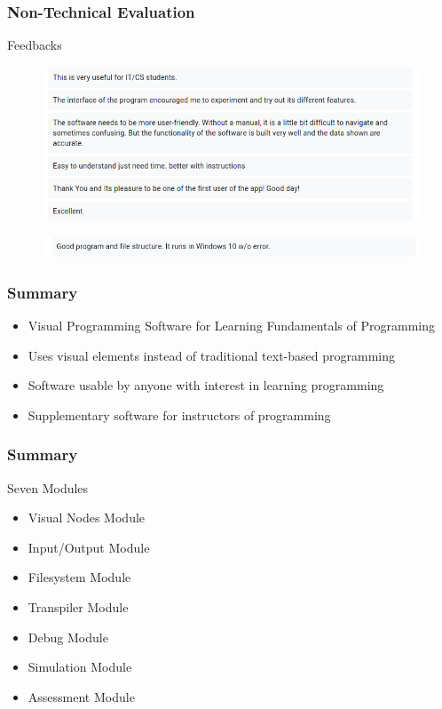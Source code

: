 \documentclass{beamer}
\begin{document}
\begin{frame}
	\frametitle{Non-Technical Evaluation}
	\begin{block}{Feedbacks}
		\begin{figure}
			\includegraphics[width=\textwidth]{figures/feedbacks/nontech1.png}
		\end{figure}
		\begin{figure}
			\includegraphics[width=\textwidth]{figures/feedbacks/nontech2.png}
		\end{figure}
	\end{block}
\end{frame}

\begin{frame}
	\frametitle{Summary}
	\begin{itemize}
		\item<1-> Visual Programming Software for Learning Fundamentals of Programming
		\item<2-> Uses visual elements instead of traditional text-based programming
		\item<3-> Software usable by anyone with interest in learning programming
		\item<4-> Supplementary software for instructors of programming
	\end{itemize}
\end{frame}

\begin{frame}
	\frametitle{Summary}
	\begin{block}{Seven Modules}
		\begin{itemize}
			\item<1-> Visual Nodes Module
			\item<2-> Input/Output Module
			\item<3-> Filesystem Module
			\item<4-> Transpiler Module
			\item<5-> Debug Module
			\item<6-> Simulation Module
			\item<7-> Assessment Module
		\end{itemize}
	\end{block}
\end{frame}
\end{document}
